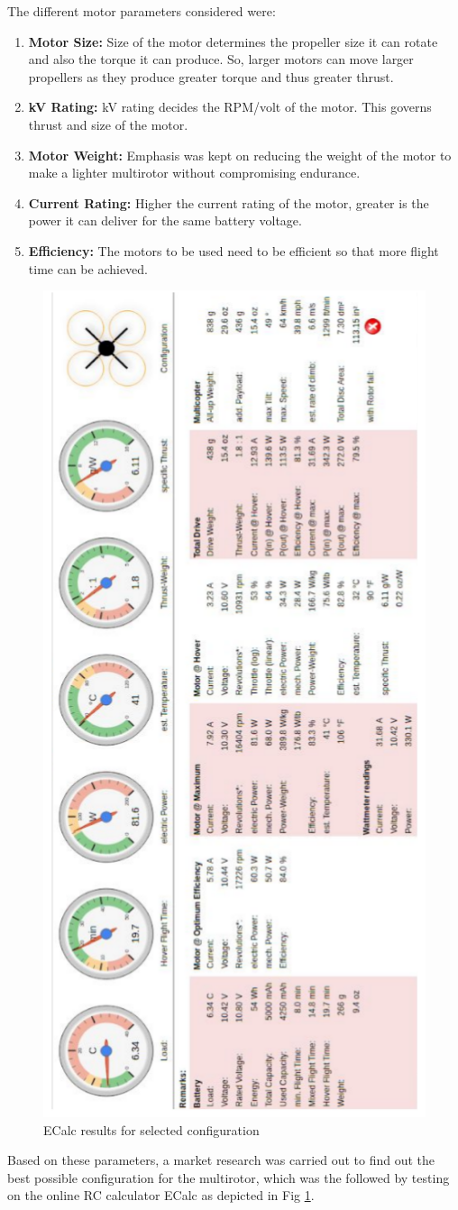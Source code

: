 \begin{spacing}{2}
The different motor parameters considered were:
\begin{enumerate}
    \item \textbf{Motor Size:} Size of the motor determines the propeller size it can rotate and also the torque it can produce. So, larger motors can move larger propellers as they produce greater torque and thus greater thrust.
    \item \textbf{kV Rating:} kV rating decides the RPM/volt of the motor. This governs thrust and size of the motor.
    \item \textbf{Motor Weight:} Emphasis was kept on reducing the weight of the motor to make a lighter multirotor without compromising endurance.
    \item \textbf{Current Rating:} Higher the current rating of the motor, greater is the power it can deliver for the same battery voltage.
    \item \textbf{Efficiency:} The motors to be used need to be efficient so that more flight time can be achieved.
\end{enumerate}
\begin{figure}[h]
    \centering
    \includegraphics[height=\linewidth, angle=270]{image/ecalc.png}
    \caption{ECalc results for selected configuration}
    \label{fig:ecalc}
\end{figure}
Based on these parameters, a market research was carried out to find out the best possible configuration for the multirotor, which was the followed by testing on the online RC calculator ECalc as depicted in Fig \ref{fig:ecalc}.


\end{spacing}
